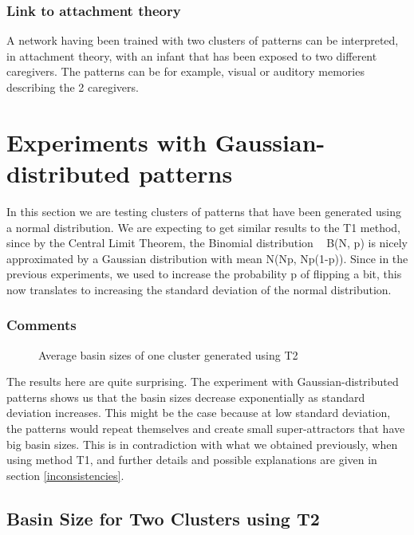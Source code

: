\subsubsection{Link to attachment theory}
A network having been trained with two clusters of patterns can be interpreted, in attachment theory, with an infant that has been exposed to two different caregivers. The patterns can be for example, visual or auditory memories describing the 2 caregivers. 



\section{Experiments with Gaussian-distributed patterns}

In this section we are testing clusters of patterns that have been generated using a normal distribution. We are expecting to get similar results to the T1 method, since by the Central Limit Theorem, the Binomial distribution ~ B(N, p) is nicely approximated by a Gaussian distribution with mean N(Np, Np(1-p)). Since in the previous experiments, we used to increase the probability p of flipping a bit, this now translates to increasing the standard deviation of the normal distribution.


\subsubsection{Comments}

\begin{figure}[h]
  \centering
  
\caption{Average basin sizes of one cluster generated using T2}
\label{fig:plot-T2-onecluster}
\end{figure}

The results here are quite surprising. The experiment with Gaussian-distributed patterns shows us that the basin sizes decrease exponentially as standard deviation increases. This might be the case because at low standard deviation, the patterns would repeat themselves and create small super-attractors that have big basin sizes.
This is in contradiction with what we obtained previously, when using method T1, and further details and possible explanations are given in section \ref{inconsistencies}.

\subsection{Basin Size for Two Clusters using T2}

